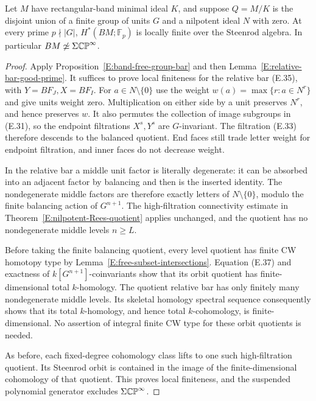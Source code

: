 \begin{theorem}\label{E:nilpotent-Rees-with-units}
Let $M$ have rectangular-band minimal ideal $K$, and suppose
$Q=M/K$ is the disjoint union of a finite group of units $G$ and a
nilpotent ideal $N$ with zero.  At every prime $p\nmid|G|$,
$H^*(BM;\mathbb F_p)$ is locally finite over the Steenrod algebra.
In particular $BM\not\simeq\Sigma\mathbb {CP}^\infty$.
\end{theorem}

\begin{proof}
Apply Proposition~\ref{E:band-free-group-bar} and then
Lemma~\ref{E:relative-bar-good-prime}.  It suffices to prove local
finiteness for the relative bar (E.35), with $Y=BF_J,X=BF_I$.
For $a\in N\setminus\{0\}$ use the weight
$w(a)=\max\{r:a\in N^r\}$ and give units weight zero.
Multiplication on either side by a unit preserves $N^r$, and hence
preserves $w$.  It also permutes the collection of image subgroups
in (E.31), so the endpoint filtrations $X^s,Y^s$ are $G$-invariant.
The filtration (E.33) therefore descends to the balanced quotient.
End faces still trade letter weight for endpoint filtration, and
inner faces do not decrease weight.

In the relative bar a middle unit factor is literally degenerate:
it can be absorbed into an adjacent factor by balancing and then
is the inserted identity.  The nondegenerate middle factors are
therefore exactly letters of $N\setminus\{0\}$, modulo the finite
balancing action of $G^{n+1}$.  The high-filtration connectivity
estimate in Theorem~\ref{E:nilpotent-Rees-quotient} applies unchanged,
and the quotient has no nondegenerate middle levels $n\geq L$.

Before taking the finite balancing quotient, every level quotient
has finite CW homotopy type by Lemma~\ref{E:free-subset-intersections}.
Equation (E.37) and exactness of $k[G^{n+1}]$-coinvariants show that
its orbit quotient has finite-dimensional total $k$-homology.
The quotient relative bar has only finitely many nondegenerate
middle levels.  Its skeletal homology spectral sequence consequently
shows that its total $k$-homology, and hence total $k$-cohomology, is
finite-dimensional.  No assertion of integral finite CW type for
these orbit quotients is needed.

As before, each fixed-degree cohomology class lifts to one such
high-filtration quotient.  Its Steenrod orbit is contained in the
image of the finite-dimensional cohomology of that quotient.
This proves local finiteness, and the suspended polynomial generator
excludes $\Sigma\mathbb {CP}^\infty$.
\end{proof}

